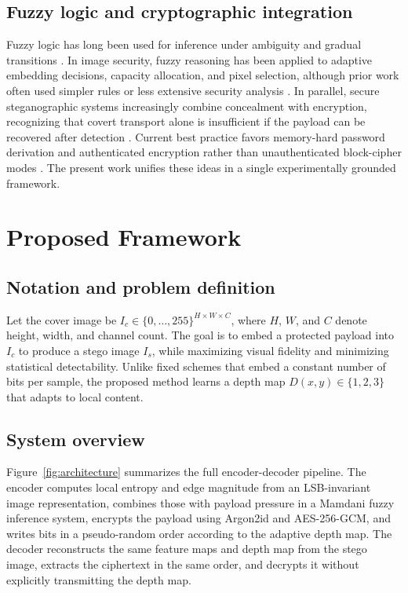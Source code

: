 \subsection{Fuzzy logic and cryptographic integration}
Fuzzy logic has long been used for inference under ambiguity and gradual transitions \cite{zadeh1965,mamdani1975,ross2010,wang1992}. In image security, fuzzy reasoning has been applied to adaptive embedding decisions, capacity allocation, and pixel selection, although prior work often used simpler rules or less extensive security analysis \cite{khurshid2020,abdulla2014}. In parallel, secure steganographic systems increasingly combine concealment with encryption, recognizing that covert transport alone is insufficient if the payload can be recovered after detection \cite{cox2007,zhang2011}. Current best practice favors memory-hard password derivation and authenticated encryption rather than unauthenticated block-cipher modes \cite{rfc9106,nistgcm}. The present work unifies these ideas in a single experimentally grounded framework.

\section{Proposed Framework}
\subsection{Notation and problem definition}
Let the cover image be \(I_c \in \{0,\ldots,255\}^{H \times W \times C}\), where \(H\), \(W\), and \(C\) denote height, width, and channel count. The goal is to embed a protected payload into \(I_c\) to produce a stego image \(I_s\), while maximizing visual fidelity and minimizing statistical detectability. Unlike fixed schemes that embed a constant number of bits per sample, the proposed method learns a depth map \(D(x,y) \in \{1,2,3\}\) that adapts to local content.

\subsection{System overview}
Figure~\ref{fig:architecture} summarizes the full encoder-decoder pipeline. The encoder computes local entropy and edge magnitude from an LSB-invariant image representation, combines those with payload pressure in a Mamdani fuzzy inference system, encrypts the payload using Argon2id and AES-256-GCM, and writes bits in a pseudo-random order according to the adaptive depth map. The decoder reconstructs the same feature maps and depth map from the stego image, extracts the ciphertext in the same order, and decrypts it without explicitly transmitting the depth map.

